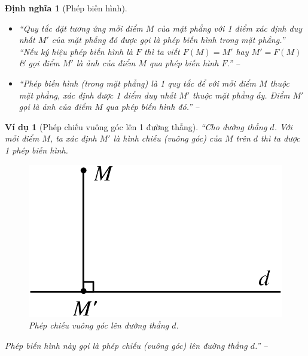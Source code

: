 \documentclass[oneside]{book}
\numberwithin{equation}{section}
\newtheorem{dinhnghia}{Định nghĩa}[section]
\newtheorem{vidu}{Ví dụ}[section]
\begin{document}
\begin{dinhnghia}[Phép biến hình]
	\begin{itemize}
		\item ``Quy tắc đặt tương ứng mỗi điểm $M$ của mặt phẳng với 1 điểm xác định duy nhất $M'$ của mặt phẳng đó được gọi là \emph{phép biến hình} trong mặt phẳng.'' ``Nếu ký hiệu phép biến hình là $F$ thì ta viết $F(M) = M'$ hay $M' = F(M)$ \& gọi điểm $M'$ là \emph{ảnh} của điểm $M$ qua phép biến hình $F$.'' -- \cite[p. 4]{SGK_Toan_11_hinh_hoc_co_ban}
		\item ``\emph{Phép biến hình} (trong mặt phẳng) là 1 quy tắc để với mỗi điểm $M$ thuộc mặt phẳng, xác định được 1 điểm duy nhất $M'$ thuộc mặt phẳng ấy. Điểm $M'$ gọi là \emph{ảnh} của điểm $M$ qua phép biến hình đó.'' -- \cite[p. 4]{SGK_Toan_11_hinh_hoc_nang_cao}
	\end{itemize}	
\end{dinhnghia}

\begin{vidu}[Phép chiếu vuông góc lên 1 đường thẳng]
	``Cho đường thẳng $d$. Với mỗi điểm $M$, ta xác định $M'$ là hình chiếu (vuông góc) của $M$ trên $d$ thì ta được 1 phép biến hình.
	
	\begin{figure}[H]
		\centering
		\includegraphics[scale=0.15]{phep_chieu_vuong_goc}
		\caption{Phép chiếu vuông góc lên đường thẳng $d$.}
		\label{fig:phep chieu vuong goc len duong thang}
	\end{figure}
	Phép biến hình này gọi là \emph{phép chiếu (vuông góc) lên đường thẳng $d$}.'' -- \cite[p. 4]{SGK_Toan_11_hinh_hoc_nang_cao}
\end{vidu}
\end{document}
